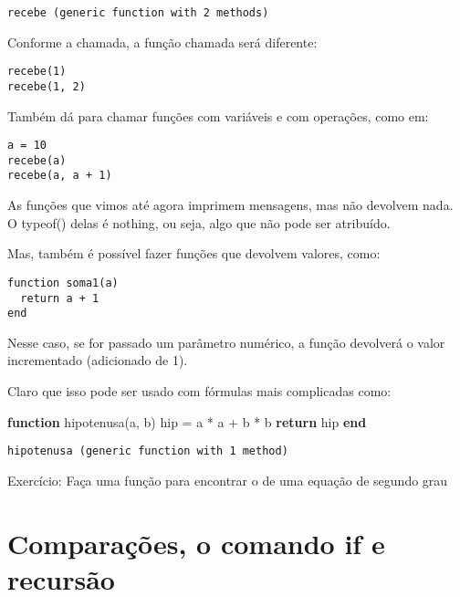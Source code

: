 \documentclass[
  letterpaper,
  DIV=11,
  numbers=noendperiod]{scrreprt}
\newenvironment{Shaded}{\begin{snugshade}}{\end{snugshade}}
\newcommand{\ControlFlowTok}[1]{\textcolor[rgb]{0.00,0.23,0.31}{\textbf{#1}}}
\newcommand{\FunctionTok}[1]{\textcolor[rgb]{0.28,0.35,0.67}{#1}}
\newcommand{\KeywordTok}[1]{\textcolor[rgb]{0.00,0.23,0.31}{\textbf{#1}}}
\newcommand{\NormalTok}[1]{\textcolor[rgb]{0.00,0.23,0.31}{#1}}
\newcommand{\OperatorTok}[1]{\textcolor[rgb]{0.37,0.37,0.37}{#1}}
\begin{document}
\begin{verbatim}
recebe (generic function with 2 methods)
\end{verbatim}

Conforme a chamada, a função chamada será diferente:

\begin{verbatim}
recebe(1)
recebe(1, 2)
\end{verbatim}

Também dá para chamar funções com variáveis e com operações, como em:

\begin{verbatim}
a = 10
recebe(a)
recebe(a, a + 1)
\end{verbatim}

As funções que vimos até agora imprimem mensagens, mas não devolvem
nada. O typeof() delas é nothing, ou seja, algo que não pode ser
atribuído.

Mas, também é possível fazer funções que devolvem valores, como:

\begin{verbatim}
function soma1(a)
  return a + 1
end
\end{verbatim}

Nesse caso, se for passado um parâmetro numérico, a função devolverá o
valor incrementado (adicionado de 1).

Claro que isso pode ser usado com fórmulas mais complicadas como:

\begin{Shaded}
\begin{Highlighting}[]
\KeywordTok{function} \FunctionTok{hipotenusa}\NormalTok{(a, b)}
\NormalTok{  hip }\OperatorTok{=}\NormalTok{ a }\OperatorTok{*}\NormalTok{ a }\OperatorTok{+}\NormalTok{ b }\OperatorTok{*}\NormalTok{ b}
  \ControlFlowTok{return}\NormalTok{ hip}
\KeywordTok{end}
\end{Highlighting}
\end{Shaded}

\begin{verbatim}
hipotenusa (generic function with 1 method)
\end{verbatim}

Exercício: Faça uma função para encontrar o \Delta de uma equação de
segundo grau


\chapter{Comparações, o comando if e
recursão}\label{comparauxe7uxf5es-o-comando-if-e-recursuxe3o}
\end{document}
